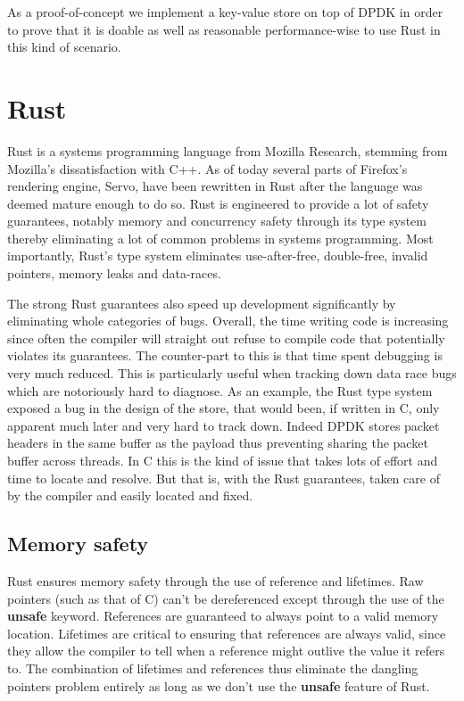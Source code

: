 \documentclass[11pt]{article}
\begin{document}
As a proof-of-concept we implement a key-value store on top of
DPDK in order to prove that it is doable as well as reasonable
performance-wise to use Rust in this kind of scenario.

\section{Rust}
Rust is a systems programming language from Mozilla Research, stemming
from Mozilla's dissatisfaction with C++. As of today several parts of
Firefox's rendering engine, Servo, have been rewritten
in Rust after the language was deemed mature enough to do so. Rust is
engineered to  provide a lot of safety guarantees, notably memory and
concurrency safety through its type system thereby eliminating a lot
of common problems in systems programming. Most importantly, Rust's
type system eliminates use-after-free, double-free, invalid pointers,
memory leaks and data-races.

The strong Rust guarantees also speed up development significantly by
eliminating whole categories of bugs. Overall, the time writing code
is increasing since often the compiler will straight out refuse to
compile code that potentially violates its guarantees. The
counter-part to this is that time spent debugging is very much
reduced. This is particularly useful when tracking down data race bugs
which are notoriously hard to diagnose. As an example, the Rust type
system exposed a bug in the design of the store, that would been, if
written in C, only apparent much later and very hard to track
down. Indeed DPDK stores packet headers in the same buffer as the
payload thus preventing sharing the packet buffer across threads. In C
this is the kind of issue that takes lots of effort and time to locate
and resolve. But that is, with the Rust guarantees, taken care of by
the compiler and easily located and fixed.

\subsection{Memory safety}

Rust ensures memory safety through the use of reference and
lifetimes. Raw pointers (such as that of C) can't be dereferenced
except through the use of the \textbf{unsafe} keyword. References are
guaranteed to always point to a valid memory location. Lifetimes are
critical to ensuring that references are always valid, since they
allow the compiler to tell when a reference might outlive the value it
refers to. The combination of lifetimes and references thus eliminate
the dangling pointers problem entirely as long as we don't use the
\textbf{unsafe} feature of Rust.
\end{document}
